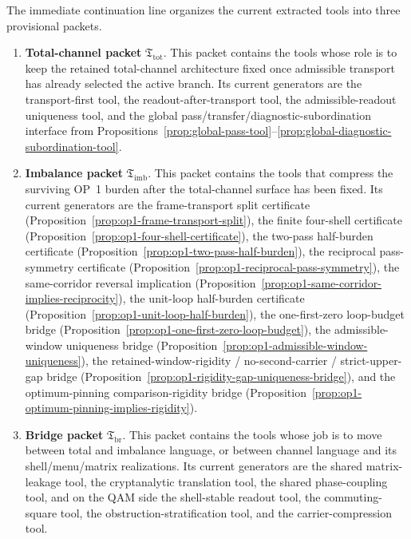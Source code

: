 \begin{definition}
\label{def:normalized-channel-sorted-tool-packets}
The immediate continuation line organizes the current extracted tools into three provisional packets.
\begin{enumerate}[leftmargin=2em]
  \item \textbf{Total-channel packet} \(\mathfrak T_{\mathrm{tot}}\). This packet contains the tools whose role is to keep the retained total-channel architecture fixed once admissible transport has already selected the active branch. Its current generators are the transport-first tool, the readout-after-transport tool, the admissible-readout uniqueness tool, and the global pass/transfer/diagnostic-subordination interface from Propositions~\ref{prop:global-pass-tool}--\ref{prop:global-diagnostic-subordination-tool}.

  \item \textbf{Imbalance packet} \(\mathfrak T_{\mathrm{imb}}\). This packet contains the tools that compress the surviving OP~1 burden after the total-channel surface has been fixed. Its current generators are the frame-transport split certificate (Proposition~\ref{prop:op1-frame-transport-split}), the finite four-shell certificate (Proposition~\ref{prop:op1-four-shell-certificate}), the two-pass half-burden certificate (Proposition~\ref{prop:op1-two-pass-half-burden}), the reciprocal pass-symmetry certificate (Proposition~\ref{prop:op1-reciprocal-pass-symmetry}), the same-corridor reversal implication (Proposition~\ref{prop:op1-same-corridor-implies-reciprocity}), the unit-loop half-burden certificate (Proposition~\ref{prop:op1-unit-loop-half-burden}), the one-first-zero loop-budget bridge (Proposition~\ref{prop:op1-one-first-zero-loop-budget}), the admissible-window uniqueness bridge (Proposition~\ref{prop:op1-admissible-window-uniqueness}), the retained-window-rigidity / no-second-carrier / strict-upper-gap bridge (Proposition~\ref{prop:op1-rigidity-gap-uniqueness-bridge}), and the optimum-pinning comparison-rigidity bridge (Proposition~\ref{prop:op1-optimum-pinning-implies-rigidity}).

  \item \textbf{Bridge packet} \(\mathfrak T_{\mathrm{br}}\). This packet contains the tools whose job is to move between total and imbalance language, or between channel language and its shell/menu/matrix realizations. Its current generators are the shared matrix-leakage tool, the cryptanalytic translation tool, the shared phase-coupling tool, and on the QAM side the shell-stable readout tool, the commuting-square tool, the obstruction-stratification tool, and the carrier-compression tool.
\end{enumerate}
\end{definition}

